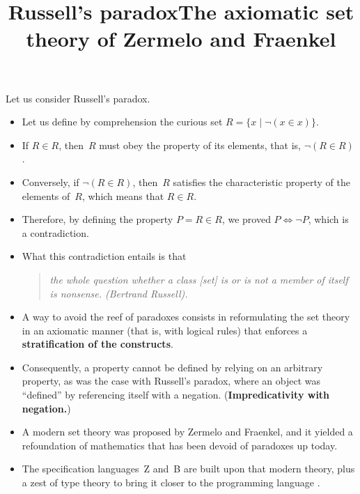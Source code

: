 \documentclass[wide]{slides}
\begin{document}
\begin{slide}
  \title{Russell's paradox}

  Let us consider Russell's paradox.
  \begin{itemize}

    \item Let us define by comprehension the curious set $R = \{x \mid
      \neg(x \in x)\}$.

    \item If $R \in R$, then~$R$ must obey the property of its
      elements, that is, $\neg(R \in R)$.

    \item Conversely, if $\neg(R \in R)$, then~$R$ satisfies the
      characteristic property of the elements of~$R$, which means that
      $R \in R$.

    \item Therefore, by defining the property $P = R \in R$, we proved
      \(P \Leftrightarrow \neg P\), which is a contradiction.

    \item What this contradiction entails is that
      \begin{quote}
        \textit{the whole question whether a class [set] is or is not
          a member of itself is nonsense.  (Bertrand Russell).}
      \end{quote}

  \end{itemize}
\end{slide}

\begin{slide}
  \title{The axiomatic set theory of Zermelo and Fraenkel}

  \begin{itemize}

    \item A way to avoid the reef of paradoxes consists in
      reformulating the set theory in an axiomatic manner (that is,
      with logical rules) that enforces a \textbf{stratification of
        the constructs}.

    \item Consequently, a property cannot be defined by relying on an
      arbitrary property, as was the case with Russell's paradox,
      where an object was ``defined'' by referencing itself with a
      negation. (\textbf{Impredicativity with negation.})

    \item A modern set theory was proposed by Zermelo and Fraenkel,
      and it yielded a refoundation of mathematics that has been
      devoid of paradoxes up today.

    \item The specification languages~\textsf{Z} and~\textsf{B} are
      built upon that modern theory, plus a zest of type theory to
      bring it closer to the programming language \Ada.

  \end{itemize}

\end{slide}
\end{document}
